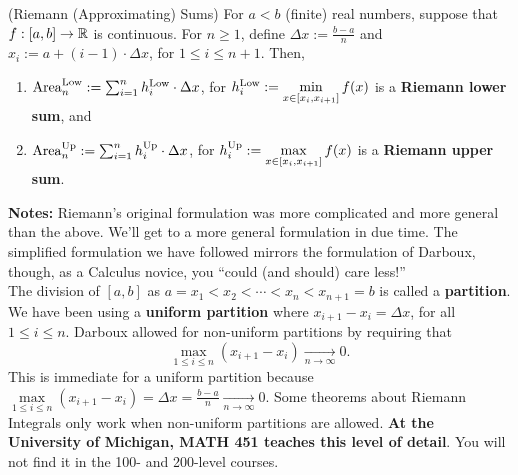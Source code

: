 \begin{tcolorbox}[colback=mylightblue, title = {\bf Riemann Lower and Upper Sums}, breakable]

\begin{definition}
\label{def:RiemannLowerUpperSums}
(Riemann (Approximating) Sums) For $a < b$ (finite) real numbers, suppose that $f:[a, b] \to \mathbb R$ is continuous. For $n\ge 1$, define $\Delta x := \frac{b-a}{n}$ and $x_i := a + (i-1) \cdot \Delta x$, for $1 \le i \le n+1$. Then,
\begin{enumerate}
\renewcommand{\labelenumi}{(\alph{enumi})}
\setlength{\itemsep}{.2cm}
    \item  ${\rm Area}^{\rm Low}_n : = \sum_{i=1}^n h_i^{\rm Low} \cdot \Delta x$, for $h_i^{\rm Low}:= \displaystyle \min_{x \in [x_i, x_{i+1}]} f(x)$ is a \textbf{Riemann lower sum}, and 
     \item  ${\rm Area}^{\rm Up}_n : = \sum_{i=1}^n h_i^{\rm Up} \cdot \Delta x$, for $h_i^{\rm Up}:= \displaystyle \max_{x \in [x_i, x_{i+1}]} f(x)$ is a \textbf{Riemann upper sum}.
\end{enumerate}
\end{definition}

\textbf{Notes:} Riemann's original formulation was more complicated and more general than the above. We'll get to a more general formulation in due time. The simplified formulation we have followed mirrors the formulation of Darboux, though, as a Calculus novice, you ``could (and should) care less!'' \\

The division of $[a, b]$ as $a=x_1 < x_2 < \cdots <x_{n} < x_{n+1}=b$ is called a \textbf{partition}. We have been using a  \textbf{uniform partition} where $x_{i+1} - x_i = \Delta x$, for all $1 \le i \le n$. Darboux allowed for non-uniform partitions by requiring that 
$$ \max_{1 \le i \le n} (x_{i+1} - x_i) \underset{n \to \infty}{\longrightarrow} 0.$$
This is immediate for a uniform partition because  $\underset{1 \le i \le n}{\max} (x_{i+1} - x_i)  = \Delta x = \frac{b-a}{n}\underset{n \to \infty}{\longrightarrow} 0$. Some theorems about Riemann Integrals only work when non-uniform partitions are allowed. \textbf{At the University of Michigan, MATH 451 teaches this level of detail}. You will not find it in the 100- and 200-level courses.

\end{tcolorbox}

